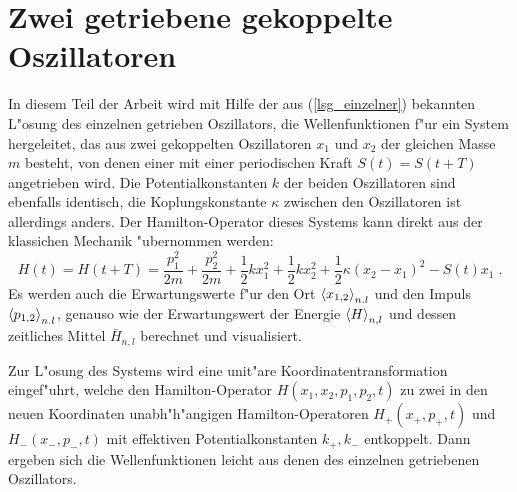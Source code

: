 \section{Zwei getriebene gekoppelte Oszillatoren}
  In diesem Teil der Arbeit wird mit Hilfe der aus (\ref{lsg_einzelner}) bekannten L"osung des einzelnen getrieben Oszillators, die Wellenfunktionen f"ur ein System hergeleitet, das aus zwei gekoppelten Oszillatoren $x_1$ und $x_2$ der gleichen Masse $m$ besteht, von denen einer mit einer periodischen Kraft $S(t) = S(t+T)$ angetrieben wird.
  Die Potentialkonstanten $k$ der beiden Oszillatoren sind ebenfalls identisch, die Koplungskonstante $\kappa$ zwischen den Oszillatoren ist allerdings anders.
  Der Hamilton-Operator dieses Systems kann direkt aus der klassichen Mechanik "ubernommen werden:
  \begin{equation}
    H(t) = H(t+T) = \frac{p_1^2}{2m} + \frac{p_2^2}{2m} + \frac 1 2 kx_1^2 + \frac 1 2 kx_2^2 + \frac 1 2 \kappa(x_2-x_1)^2 - S(t)x_1 \; .
  \end{equation}
  Es werden auch die Erwartungswerte f"ur  den Ort $\braket{x_{1,2}}_{n.l}$ und den Impuls $\braket{p_{1,2}}_{n.l}$, genauso wie der Erwartungswert der Energie $\braket{H}_{n,l}$ und dessen zeitliches Mittel $\bar{H}_{n,l}$ berechnet und visualisiert.

  Zur L"osung des Systems wird eine unit"are Koordinatentransformation eingef"uhrt, welche den Hamilton-Operator $H(x_1,x_2,p_1,p_2,t)$ zu zwei in den neuen Koordinaten unabh"h"angigen Hamilton-Operatoren $H_+(x_+,p_+,t)$ und $H_-(x_-,p_-,t)$ mit effektiven Potentialkonstanten $k_+,k_-$ entkoppelt.
  Dann ergeben sich die Wellenfunktionen leicht aus denen des einzelnen getriebenen Oszillators.



